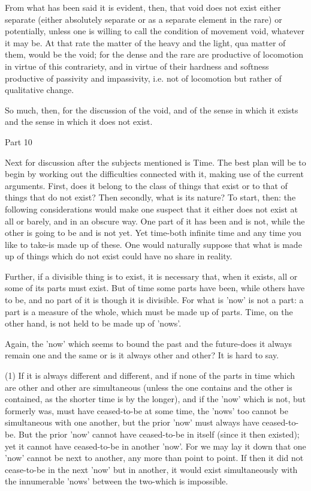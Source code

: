 From what has been said it is evident, then, that void does not exist
either separate (either absolutely separate or as a separate element
in the rare) or potentially, unless one is willing to call the condition
of movement void, whatever it may be. At that rate the matter of the
heavy and the light, qua matter of them, would be the void; for the
dense and the rare are productive of locomotion in virtue of this
contrariety, and in virtue of their hardness and softness productive
of passivity and impassivity, i.e. not of locomotion but rather of
qualitative change. 

So much, then, for the discussion of the void, and of the sense in
which it exists and the sense in which it does not exist.

Part 10

Next for discussion after the subjects mentioned is Time. The best
plan will be to begin by working out the difficulties connected with
it, making use of the current arguments. First, does it belong to
the class of things that exist or to that of things that do not exist?
Then secondly, what is its nature? To start, then: the following considerations
would make one suspect that it either does not exist at all or barely,
and in an obscure way. One part of it has been and is not, while the
other is going to be and is not yet. Yet time-both infinite time and
any time you like to take-is made up of these. One would naturally
suppose that what is made up of things which do not exist could have
no share in reality. 

Further, if a divisible thing is to exist, it is necessary that, when
it exists, all or some of its parts must exist. But of time some parts
have been, while others have to be, and no part of it is though it
is divisible. For what is 'now' is not a part: a part is a measure
of the whole, which must be made up of parts. Time, on the other hand,
is not held to be made up of 'nows'. 

Again, the 'now' which seems to bound the past and the future-does
it always remain one and the same or is it always other and other?
It is hard to say. 

(1) If it is always different and different, and if none of the parts
in time which are other and other are simultaneous (unless the one
contains and the other is contained, as the shorter time is by the
longer), and if the 'now' which is not, but formerly was, must have
ceased-to-be at some time, the 'nows' too cannot be simultaneous with
one another, but the prior 'now' must always have ceased-to-be. But
the prior 'now' cannot have ceased-to-be in itself (since it then
existed); yet it cannot have ceased-to-be in another 'now'. For we
may lay it down that one 'now' cannot be next to another, any more
than point to point. If then it did not cease-to-be in the next 'now'
but in another, it would exist simultaneously with the innumerable
'nows' between the two-which is impossible. 

